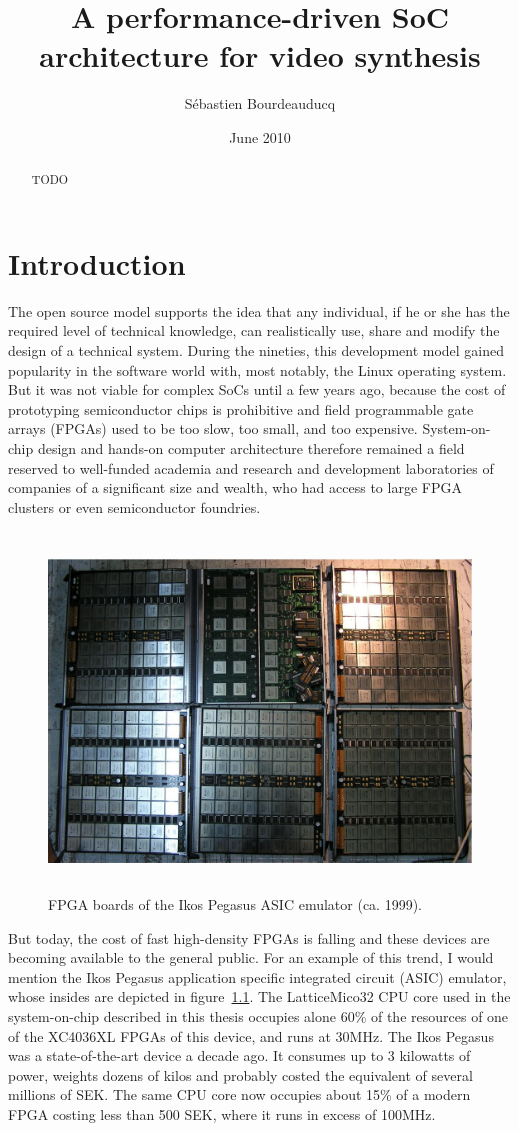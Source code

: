 \documentclass[a4paper,11pt]{kthesis}
\title{A performance-driven SoC architecture for video synthesis}
\date{June 2010}
\author{S\'ebastien Bourdeauducq}
\begin{document}
\begin{abstract}
TODO
\end{abstract}

\tableofcontents
\listoffigures

\mainmatter

\chapter{Introduction}
The open source model supports the idea that any individual, if he or she has the required level of technical knowledge, can realistically use, share and modify the design of a technical system. During the nineties, this development model gained popularity in the software world with, most notably, the Linux operating system. But it was not viable for complex SoCs until a few years ago, because the cost of prototyping semiconductor chips is prohibitive and field programmable gate arrays (FPGAs) used to be too slow, too small, and too expensive. System-on-chip design and hands-on computer architecture therefore remained a field reserved to well-funded academia and research and development laboratories of companies of a significant size and wealth, who had access to large FPGA clusters or even semiconductor foundries.

\begin{figure}[htp]
\centering
\includegraphics[height=95mm]{ikosboards.eps}
\caption{FPGA boards of the Ikos Pegasus ASIC emulator (ca. 1999).}
\label{fig:ikos}
\end{figure}

But today, the cost of fast high-density FPGAs is falling and these devices are becoming available to the general public. For an example of this trend, I would mention the Ikos Pegasus application specific integrated circuit (ASIC) emulator, whose insides are depicted in figure~\ref{fig:ikos}. The LatticeMico32 CPU core used in the system-on-chip described in this thesis occupies alone 60\% of the resources of one of the XC4036XL FPGAs of this device, and runs at 30MHz. The Ikos Pegasus was a state-of-the-art device a decade ago. It consumes up to 3 kilowatts of power, weights dozens of kilos and probably costed the equivalent of several millions of SEK. The same CPU core now occupies about 15\% of a modern FPGA costing less than 500 SEK, where it runs in excess of 100MHz.
\end{document}
